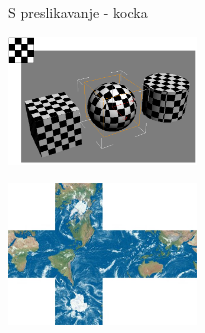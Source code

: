 \documentclass[9pt]{beamer}
\begin{document}
\begin{frame}{S preslikavanje - kocka}
	
	\begin{center}
		\includegraphics[width=5cm]{slike/02_projekcije_cubical.png}
	\end{center}
	\begin{center}
		\includegraphics[width=5cm]{slike/earthcube_cross.jpg}
	\end{center}
\end{frame}
%
\end{document}
